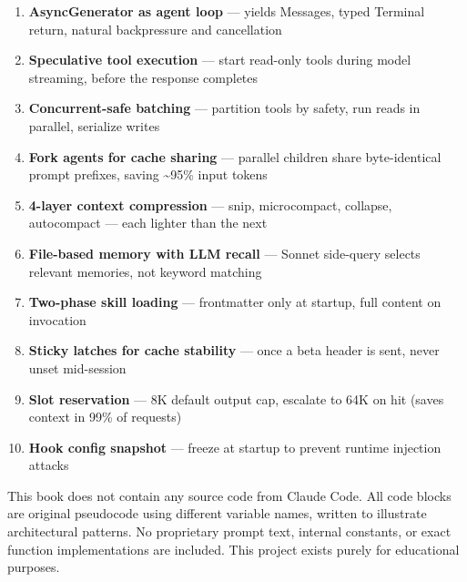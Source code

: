 \documentclass[
  english,
  11pt,
  letterpaper,
]{book}
\providecommand{\tightlist}{%
  \setlength{\itemsep}{0pt}\setlength{\parskip}{0pt}}
\begin{document}
\begin{enumerate}
\def\labelenumi{\arabic{enumi}.}
\tightlist
\item
  \textbf{AsyncGenerator as agent loop} --- yields Messages, typed
  Terminal return, natural backpressure and cancellation
\item
  \textbf{Speculative tool execution} --- start read-only tools during
  model streaming, before the response completes
\item
  \textbf{Concurrent-safe batching} --- partition tools by safety, run
  reads in parallel, serialize writes
\item
  \textbf{Fork agents for cache sharing} --- parallel children share
  byte-identical prompt prefixes, saving \textasciitilde95\% input
  tokens
\item
  \textbf{4-layer context compression} --- snip, microcompact, collapse,
  autocompact --- each lighter than the next
\item
  \textbf{File-based memory with LLM recall} --- Sonnet side-query
  selects relevant memories, not keyword matching
\item
  \textbf{Two-phase skill loading} --- frontmatter only at startup, full
  content on invocation
\item
  \textbf{Sticky latches for cache stability} --- once a beta header is
  sent, never unset mid-session
\item
  \textbf{Slot reservation} --- 8K default output cap, escalate to 64K
  on hit (saves context in 99\% of requests)
\item
  \textbf{Hook config snapshot} --- freeze at startup to prevent runtime
  injection attacks
\end{enumerate}

\begin{tcolorbox}[enhanced jigsaw, opacitybacktitle=0.6, coltitle=black, arc=.35mm, colframe=quarto-callout-note-color-frame, colback=white, leftrule=.75mm, colbacktitle=quarto-callout-note-color!10!white, breakable, left=2mm, toptitle=1mm, opacityback=0, toprule=.15mm, bottomtitle=1mm, title=\textcolor{quarto-callout-note-color}{\faInfo}\hspace{0.5em}{Note}, titlerule=0mm, rightrule=.15mm, bottomrule=.15mm]

This book does not contain any source code from Claude Code. All code
blocks are original pseudocode using different variable names, written
to illustrate architectural patterns. No proprietary prompt text,
internal constants, or exact function implementations are included. This
project exists purely for educational purposes.

\end{tcolorbox}
\end{document}
